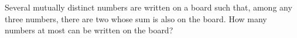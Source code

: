 \problem{}
Several mutually distinct numbers are written on a board such that, among any three
numbers, there are two whose sum is also on the board.
How many numbers at most can be written on the board?
\solution
\endproblem
